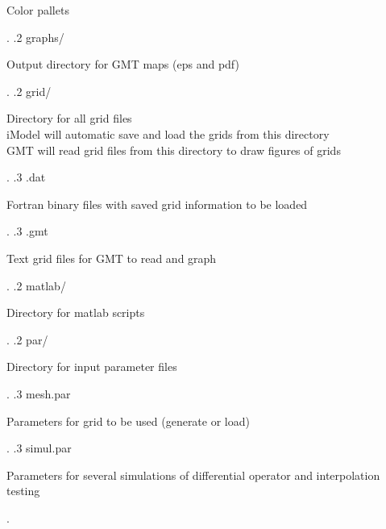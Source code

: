 \documentclass[a4paper,10pt]{article}
\begin{document}
{\begin{minipage}[t]{10cm}
	    Color pallets \\
          \end{minipage}.
.2 graphs/ \hspace{1cm}  \begin{minipage}[t]{10cm}
          Output directory for GMT maps (eps and pdf)\\
          \end{minipage}.
.2 grid/ \hspace{1cm}  \begin{minipage}[t]{10cm}
          Directory for all grid files\\
	  iModel will automatic save and load the grids from this directory\\
	  GMT will read grid files from this directory to draw figures of grids\\
          \end{minipage}.
.3 {.}dat \hspace{1cm}  \begin{minipage}[t]{10cm}
          Fortran binary files with saved grid information to be loaded\\
	  \end{minipage}.
.3 {.gmt} \hspace{1cm}  \begin{minipage}[t]{10cm}
	    Text grid files for GMT to read and graph\\
          \end{minipage}.
.2 matlab/ \hspace{1cm}  \begin{minipage}[t]{10cm}
          Directory for matlab scripts\\
          \end{minipage}.
.2 par/ \hspace{1cm}  \begin{minipage}[t]{10cm}
          Directory for input parameter files
          \end{minipage}.
.3 mesh{.}par \hspace{1cm}  \begin{minipage}[t]{10cm}
          Parameters for grid to be used (generate or load)\\
	  \end{minipage}.
.3 simul{.}par \hspace{1cm}  \begin{minipage}[t]{10cm}
	    Parameters for several simulations of differential operator and interpolation testing\\
          \end{minipage}.
}
\end{document}
